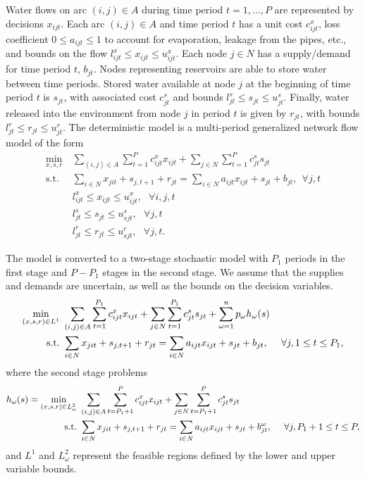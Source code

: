 \documentclass[ijoc,nonblindrev]{informs3} %
\newcommand{\st}{\mbox{s.t.}}
\begin{document}
Water flows on arc $(i,j) \in A$ during time period $t = 1, \dots, P$ are represented by decisions $x_{ijt}$.
Each arc $(i,j) \in A$ and time period $t$ has a unit cost $c_{ijt}^x$, loss coefficient $0 \leq a_{ijt} \leq 1$ to account for evaporation, leakage from the pipes, etc., and bounds on the flow $l_{ijt}^x \leq x_{ijt} \leq u_{ijt}^x$.
Each node $j \in N$ has a supply/demand for time period $t$, $b_{jt}$.
Nodes representing reservoirs are able to store water between time periods.
Stored water available at node $j$ at the beginning of time period $t$ is $s_{jt}$, with associated cost $c_{jt}^s$ and bounds $l_{jt}^s \leq s_{jt} \leq u_{jt}^s$.
Finally, water released into the environment from node $j$ in period $t$ is given by $r_{jt}$, with bounds $l_{jt}^r \leq r_{jt} \leq u_{jt}^r$.
The deterministic model is a multi-period generalized network flow model of the form
\begin{align*}
	\min_{x,s,r} \ & \sum_{(i,j) \in A} \sum_{t=1}^P c_{ijt}^x x_{ijt} + \sum_{j \in N} \sum_{t=1}^P c_{jt}^s s_{jt}\\
	\st \ & \sum_{i \in N} x_{jit} + s_{j,t+1} + r_{jt} = \sum_{i \in N} a_{ijt} x_{ijt} + s_{jt} + b_{jt}, \ \ \forall j,t \\
	& l_{ijt}^x \leq x_{ijt} \leq u_{ijt}^x,\ \ \ \forall i,j,t \\
	& l_{jt}^s \leq s_{jt} \leq u_{sjt}^s, \ \ \ \forall j,t \\
	& l_{jt}^r \leq r_{jt} \leq u_{sjt}^r, \ \ \ \forall j,t.
\end{align*}

The model is converted to a two-stage stochastic model with $P_1$ periods in the first stage and $P-P_1$ stages in the second stage.
We assume that the supplies and demands are uncertain, as well as the bounds on the decision variables.
\begin{align}
	\min_{(x,s,r) \in L^1} \ & \sum_{(i,j) \in A} \sum_{t=1}^{P_1} c_{ijt}^x x_{ijt} + \sum_{j \in N} \sum_{t=1}^{P_1} c_{jt}^s s_{jt} + \sum_{\omega=1}^n p_\omega h_\omega(s) \label{eq:gen_network_two_stage} \\
	\st \ & \sum_{i \in N} x_{jit} + s_{j,t+1} + r_{jt} = \sum_{i \in N} a_{ijt} x_{ijt} + s_{jt} + b_{jt},\ \ \ \ \forall j, 1 \leq t \leq P_1, \notag
\end{align}
where the second stage problems
\begin{align}
	h_\omega(s) = \min_{(x,s,r) \in L^2_\omega} \ & \sum_{(i,j) \in A} \sum_{t=P_1+1}^{P} c_{ijt}^x x_{ijt} + \sum_{j \in N} \sum_{t=P_1+1}^{P} c_{jt}^s s_{jt} \label{eq:gen_network_second_stage} \\
	\st \ & \sum_{i \in N} x_{jit} + s_{j,t+1} + r_{jt} = \sum_{i \in N} a_{ijt} x_{ijt} + s_{jt} + b_{jt}^\omega, \ \ \ \ \forall j, P_1+1 \leq t \leq P, \notag
\end{align}
and $L^1$ and $L^2_\omega$ represent the feasible regions defined by the lower and upper variable bounds.
\end{document}
